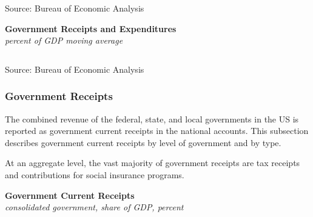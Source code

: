 \documentclass{report}
\newcommand{\tbllink}[1]{\href{https://raw.githubusercontent.com/bdecon/US-chartbook/master/chartbook/data/#1}{\faTable}}
\begin{document}
{\begin{minipage}{1.0\textwidth}
\footnotesize{Source: Bureau of Economic Analysis} \hfill \tbllink{fedgdp.csv} \ \tbllink{slggdp.csv}
\vspace{5mm}

\normalsize \textbf{Government Receipts and Expenditures}\\
\footnotesize{\textit{percent of GDP \hspace{75mm} moving average}}\\ 
 \setlength{\tabcolsep}{3.0pt} \color{black!90}
		{\renewcommand{\arraystretch}{1.5}
\hspace{-2mm} \begin{tabular}{p{35mm} R{7mm} R{7mm} R{7mm} R{7mm} R{7mm} R{7mm} 
		   R{7.2mm} R{7mm} R{7mm} }
			  \hline
		\end{tabular}}\vspace{-2mm}
		
\footnotesize{Source: Bureau of Economic Analysis}
\end{minipage} 
\newpage
\vspace*{-10mm}

\begin{minipage}{1.0\textwidth}
\subsubsection*{Government Receipts} 
\small The combined revenue of the federal, state, and local governments in the US is reported as government current receipts in the national accounts. This subsection describes government current receipts by level of government and by type. 

At an aggregate level, the vast majority of government receipts are tax receipts and contributions for social insurance programs. 
\vspace{0.5mm}

\normalsize \textbf{Government Current Receipts}\\
\footnotesize{\textit{consolidated government, share of GDP, percent}}
\vspace{2.95cm}


\end{minipage}}
\end{document}

